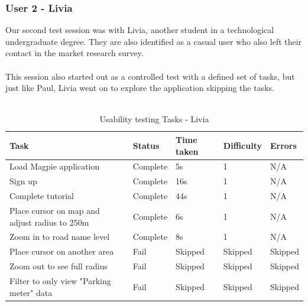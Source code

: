\newpage
\subsubsection{User 2 - Livia}
Our second test session was with Livia, another student in a technological undergraduate degree. They are also identified as a casual user who also left their contact in the market research survey.\\\\
This session also started out as a controlled test with a defined set of tasks, but just like Paul, Livia went on to explore the application skipping the tasks.\\\\
\begin{table}[h!]
    \centering
    \caption{Usability testing Tasks - Livia}
    \begin{tabular}{|p{}|p{}|p{}|p{}|p{}|}
        \hline
        \textbf{Task}                                 & \textbf{Status} & \textbf{Time taken} & \textbf{Difficulty} & \textbf{Errors} \\
        \hline
        Load Magpie application                       & Complete        & 5s                  & 1                   & N/A             \\
        \hline
        Sign up                                       & Complete        & 16s                 & 1                   & N/A             \\
        \hline
        Complete tutorial                             & Complete        & 44s                 & 1                   & N/A             \\
        \hline
        Place cursor on map and adjust radius to 250m & Complete        & 6s                  & 1                   & N/A             \\
        \hline
        Zoom in to road name level                    & Complete        & 8s                  & 1                   & N/A             \\
        \hline
        Place cursor on another area                  & Fail            & Skipped             & Skipped             & Skipped         \\
        \hline
        Zoom out to see full radius                   & Fail            & Skipped             & Skipped             & Skipped         \\
        \hline
        Filter to only view "Parking meter" data      & Fail            & Skipped             & Skipped             & Skipped         \\

\end{tabular}
\end{table}
